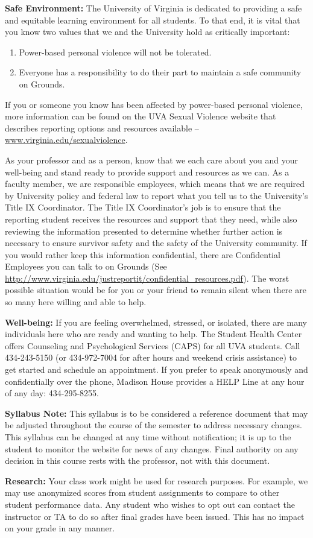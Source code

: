 \documentclass[12pt]{article}
\begin{document}
\textbf{Safe Environment:} The University of Virginia is dedicated to providing a safe and equitable learning environment for all students. To that end, it is vital that you know two values that we and the University hold as critically important:
 
\begin{enumerate}
    \item Power-based personal violence will not be tolerated. 
    \item Everyone has a responsibility to do their part to maintain a safe community on Grounds.
\end{enumerate}

If you or someone you know has been affected by power-based personal violence, more information can be found on the UVA Sexual Violence website that describes reporting options and resources available -- \url{www.virginia.edu/sexualviolence}. 
   
As your professor and as a person, know that we each care about you and your well-being and stand ready to provide support and resources as we can. As a faculty member, we are responsible employees, which means that we are required by University policy and federal law to report what you tell us to the University's Title IX Coordinator. The Title IX Coordinator's job is to ensure that the reporting student receives the resources and support that they need, while also reviewing the information presented to determine whether further action is necessary to ensure survivor safety and the safety of the University community. If you would rather keep this information confidential, there are Confidential Employees you can talk to on Grounds (See \url{http://www.virginia.edu/justreportit/confidential\_resources.pdf}). The worst possible situation would be for you or your friend to remain silent when there are so many here willing and able to help.

\textbf{Well-being:} If you are feeling overwhelmed, stressed, or isolated, there are many individuals here who are ready and wanting to help. The Student Health Center offers Counseling and Psychological Services (CAPS) for all UVA students. Call 434-243-5150 (or 434-972-7004 for after hours and weekend crisis assistance) to get started and schedule an appointment. If you prefer to speak anonymously and confidentially over the phone, Madison House provides a HELP Line at any hour of any day: 434-295-8255.

\textbf{Syllabus Note:} This syllabus is to be considered a reference document that may be adjusted throughout the course of the semester to address necessary changes. This syllabus can be changed at any time without notification; it is up to the student to monitor the website for news of any changes. Final authority on any decision in this course rests with the professor, not with this document.

\textbf{Research:}
Your class work might be used for research purposes. For example, we may use anonymized scores from student assignments to compare to other student performance data. Any student who wishes to opt out can contact the instructor or TA to do so after final grades have been issued. This has no impact on your grade in any manner. 
\end{document}
